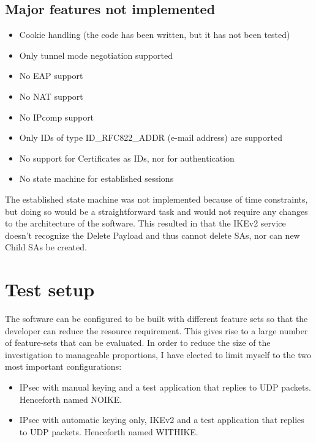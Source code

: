 \documentclass[final,a4paper,twoside,11pt,onecolumn]{report}
\begin{document}
\subsection{Major features not implemented}
\begin{itemize}
   \item Cookie handling (the code has been written, but it has not been tested)
   \item Only tunnel mode negotiation supported
   \item No EAP support
   \item No NAT support
   \item No IPcomp support
   \item Only IDs of type ID\_RFC822\_ADDR (e-mail address) are supported
   \item No support for Certificates as IDs, nor for authentication
   \item No state machine for established sessions
\end{itemize}

The established state machine was not implemented because of time constraints, but doing so would be a straightforward task and would not require any changes to the architecture of the software. This resulted in that the IKEv2 service doesn't recognize the Delete Payload and thus cannot delete SAs, nor can new Child SAs be created.



\section{Test setup}
\label{sec:test-setup}
The software can be configured to be built with different feature sets so that the developer can reduce the resource requirement. This gives rise to a large number of feature-sets that can be evaluated. In order to reduce the size of the investigation to manageable proportions, I have elected to limit myself to the two most important configurations:

\begin{itemize}
   \item IPsec with manual keying and a test application that replies to UDP packets. Henceforth named NOIKE.
   \item IPsec with automatic keying only, IKEv2 and a test application that replies to UDP packets. Henceforth named WITHIKE.
\end{itemize}
\end{document}
